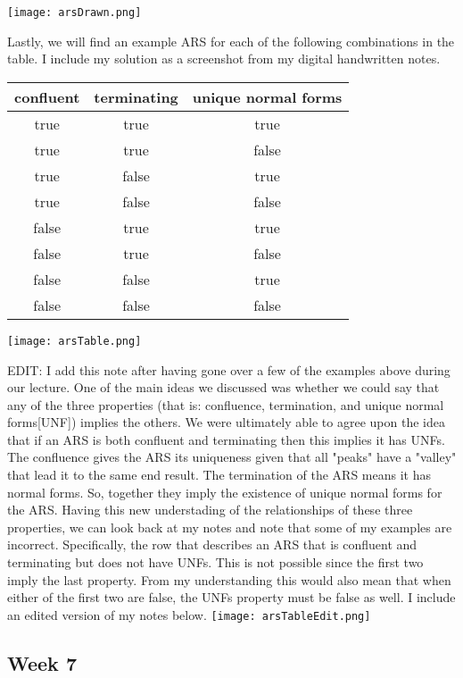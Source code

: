 \documentclass{article}
\theoremstyle{theorem}
\theoremstyle{definition}
\theoremstyle{remark}
\begin{document}
\texttt{[image: arsDrawn.png]}

Lastly, we will find an example ARS for each of the following combinations in the table. I include my solution as a screenshot from my digital handwritten notes. 
\begin{center}
  \begin{tabular}{||c c c ||} 
   \hline
   confluent & terminating & unique normal forms \\ [0.5ex] 
   \hline\hline
   true & true & true \\ 
   \hline
   true & true & false \\
   \hline
   true & false & true \\
   \hline
   true & false & false \\
   \hline
   false & true & true \\
   \hline
   false & true & false \\
   \hline
   false & false & true \\
   \hline
   false & false & false \\ [1ex] 
   \hline
  \end{tabular}
\end{center}
\texttt{[image: arsTable.png]}

EDIT: I add this note after having gone over a few of the examples above during our lecture. One of the main ideas we discussed was whether we could say that any of the three properties (that is: confluence, termination, and unique normal forms[UNF]) 
implies the others. We were ultimately able to agree upon the idea that if an ARS is both confluent and terminating then this implies it has UNFs. The confluence gives the ARS its uniqueness given that all "peaks" have a "valley" that lead it to the same 
end result. The termination of the ARS means it has normal forms. So, together they imply the existence of unique normal forms for the ARS. Having this new understading of the relationships of these three properties, we can look back at my notes and 
note that some of my examples are incorrect. Specifically, the row that describes an ARS that is confluent and terminating but does not have UNFs. This is not possible since the first two imply the last property. From my understanding
this would also mean that when either of the first two are false, the UNFs property must be false as well. I include an edited version of my notes below.
\texttt{[image: arsTableEdit.png]}

\subsection{Week 7}
\end{document}
